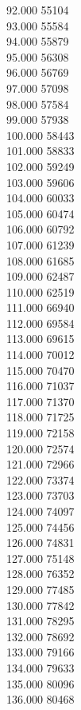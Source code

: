 { 92.000	55104 \\
 93.000	55584 \\
 94.000	55879 \\
 95.000	56308 \\
 96.000	56769 \\
 97.000	57098 \\
 98.000	57584 \\
 99.000	57938 \\
 100.000	58443 \\
 101.000	58833 \\
 102.000	59249 \\
 103.000	59606 \\
 104.000	60033 \\
 105.000	60474 \\
 106.000	60792 \\
 107.000	61239 \\
 108.000	61685 \\
 109.000	62487 \\
 110.000	62519 \\
 111.000	66940 \\
 112.000	69584 \\
 113.000	69615 \\
 114.000	70012 \\
 115.000	70470 \\
 116.000	71037 \\
 117.000	71370 \\
 118.000	71725 \\
 119.000	72158 \\
 120.000	72574 \\
 121.000	72966 \\
 122.000	73374 \\
 123.000	73703 \\
 124.000	74097 \\
 125.000	74456 \\
 126.000	74831 \\
 127.000	75148 \\
 128.000	76352 \\
 129.000	77485 \\
 130.000	77842 \\
 131.000	78295 \\
 132.000	78692 \\
 133.000	79166 \\
 134.000	79633 \\
 135.000	80096 \\
 136.000	80468 \\
}

